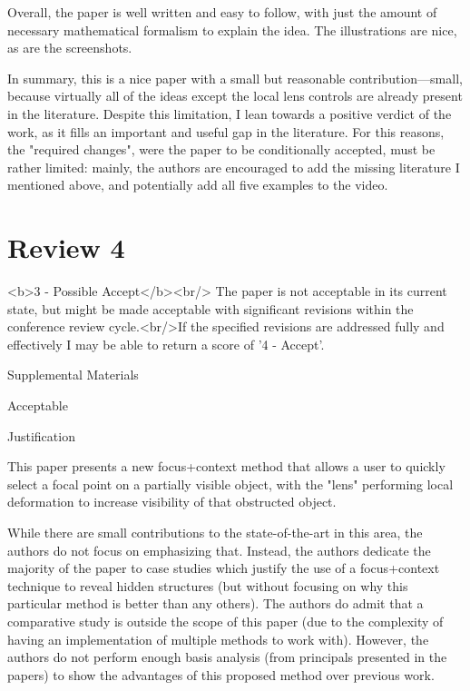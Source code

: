 \documentclass[a4paper,10pt]{article}
\begin{document}
{    Overall, the paper is well written and easy to follow, with just the amount of
    necessary mathematical formalism to explain the idea. The illustrations are nice,
    as are the screenshots.

    In summary, this is a nice paper with a small but reasonable contribution---small,
    because virtually all of the ideas except the local lens controls are already
    present in the literature. Despite this limitation, I lean towards a positive
    verdict of the work, as it fills an important and useful gap in the literature.
    For this reasons, the "required changes", were the paper to be conditionally
    accepted, must be rather limited: mainly, the authors are encouraged to add the
    missing literature I mentioned above, and potentially add all five examples to the
    video.
    
    

\section{Review 4}

<b>3 - Possible Accept</b><br/> The paper is not acceptable in its current state,
    but might be made acceptable with significant revisions within the conference
    review cycle.<br/>If the specified revisions are addressed fully and effectively I
    may be able to return a score of '4 - Accept'.

  Supplemental Materials

    Acceptable

  Justification

    This paper presents a new focus+context method that allows a user to quickly
    select a focal point on a partially visible object, with the "lens" performing
    local deformation to increase visibility of that obstructed object.

    While there are small contributions to the state-of-the-art in this area, the
    authors do not focus on emphasizing that. Instead, the authors dedicate the
    majority of the paper to case studies which justify the use of a focus+context
    technique to reveal hidden structures (but without focusing on why this particular
    method is better than any others). The authors do admit that a comparative study
    is outside the scope of this paper (due to the complexity of having an
    implementation of multiple methods to work with). However, the authors do not
    perform enough basis analysis (from principals presented in the papers) to show
    the advantages of this proposed method over previous work.

}
\end{document}
